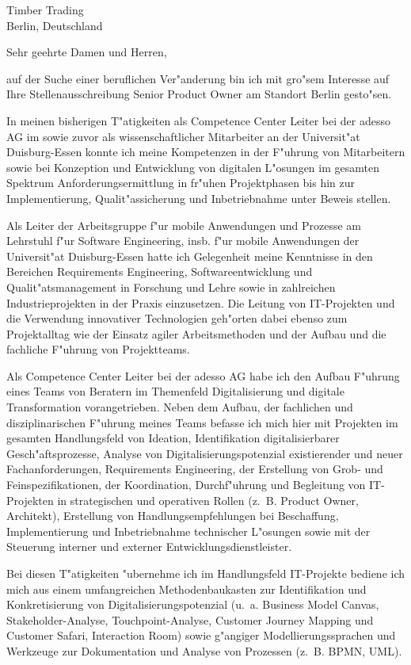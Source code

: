 \documentclass[10pt,a4paper]{dinbrief}
\date{\today}
\begin{document}
 
\begin{letter}  
{%
	Timber Trading\\
	Berlin, Deutschland
}
\subject{\bf Bewerbung Senior Product Owner}
\opening{Sehr geehrte Damen und Herren,}
auf der Suche einer beruflichen Ver"anderung bin ich mit gro"sem Interesse auf Ihre Stellenausschreibung Senior Product Owner am Standort Berlin  gesto"sen. 

In meinen bisherigen T"atigkeiten als Competence Center Leiter bei der adesso AG im sowie zuvor als wissenschaftlicher Mitarbeiter an der Universit"at Duisburg-Essen konnte ich meine Kompetenzen in der F"uhrung von Mitarbeitern sowie bei Konzeption und Entwicklung von digitalen L"osungen im gesamten Spektrum Anforderungsermittlung in fr"uhen Projektphasen bis hin zur Implementierung, Qualit"assicherung und Inbetriebnahme unter Beweis stellen.

Als Leiter der Arbeitsgruppe f"ur mobile Anwendungen und Prozesse am Lehrstuhl f"ur Software Engineering, insb. f"ur mobile Anwendungen der Universit"at Duisburg-Essen hatte ich Gelegenheit meine Kenntnisse in den Bereichen Requirements Engineering, Softwareentwicklung  und Qualit"atsmanagement in Forschung und Lehre sowie in zahlreichen Industrieprojekten in der Praxis einzusetzen. Die Leitung von IT-Projekten und die Verwendung innovativer Technologien geh"orten dabei ebenso zum Projektalltag wie der Einsatz agiler Arbeitsmethoden und der Aufbau und die fachliche  F"uhrung von Projektteams.

Als Competence Center Leiter bei der adesso AG habe ich den Aufbau F"uhrung eines Teams von Beratern im Themenfeld Digitalisierung und digitale Transformation vorangetrieben. Neben dem Aufbau, der fachlichen und disziplinarischen F"uhrung meines Teams befasse ich mich hier mit Projekten im gesamten Handlungsfeld von Ideation, Identifikation digitalisierbarer Gesch"aftsprozesse, Analyse von Digitalisierungspotenzial existierender und neuer Fachanforderungen, Requirements Engineering, der Erstellung von Grob- und Feinspezifikationen, der Koordination, Durchf"uhrung und Begleitung von IT-Projekten in strategischen und operativen Rollen (z.~B. Product Owner, Architekt), Erstellung von Handlungsempfehlungen bei Beschaffung, Implementierung und Inbetriebnahme technischer L"osungen sowie mit der Steuerung interner und externer Entwicklungsdienstleister. 

Bei diesen T"atigkeiten "ubernehme ich im Handlungsfeld IT-Projekte bediene ich mich aus einem umfangreichen Methodenbaukasten zur Identifikation und Konkretisierung von Digitalisierungspotenzial (u.~a. Business Model Canvas, Stakeholder-Analyse, Touchpoint-Analyse, Customer Journey Mapping und Customer Safari, Interaction Room) sowie g"angiger Modellierungssprachen und Werkzeuge zur Dokumentation und Analyse von Prozessen (z.~B. BPMN, UML).


\end{letter}
\end{document}
